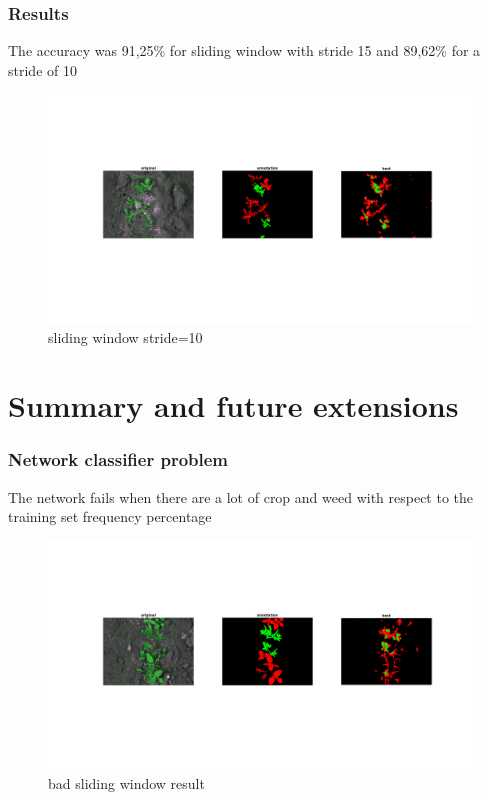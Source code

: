 \documentclass{beamer}
\begin{document}
\begin{frame}

\frametitle{Results}
The accuracy was 91,25\% for sliding window with stride 15 and 89,62\% for a stride of 10
\begin{figure}[h]
  \includegraphics[width=\linewidth]{2.png}
  \caption{sliding window stride=10}\label{fig: sliding window 10 1}
\end{figure}
\end{frame}

\section{Summary and future extensions}

\begin{frame}
\frametitle{Network classifier problem}
The network fails when there are a lot of crop and weed with respect to the training set frequency percentage

\begin{figure}[h]
	\begin{center}
		\includegraphics[width=\linewidth]{15.png}
		\caption{bad sliding window result}
		\label{fig:bad sliding window result}
	\end{center}
\end{figure}

\end{frame}
\end{document}
